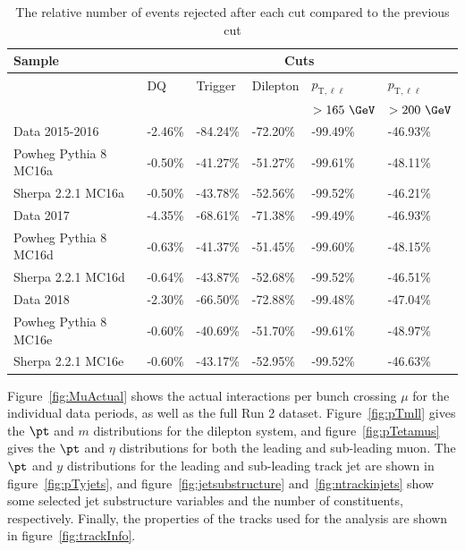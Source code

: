 \begin{table}[h!]
  \centering
  \begin{tabular}{l|l|l|l|l|l}
  \hline\hline
  \textbf{Sample} & \multicolumn{5}{c}{\textbf{Cuts}} \\ \hline
    & DQ & Trigger & Dilepton & $p_{\text{T},\ell\ell}$ & $p_{\text{T},\ell\ell}$ \\
    &  &  &  & $>165~\GeV$ & $>200~\GeV$ \\ \hline\hline
   Data 2015-2016 & -2.46\% & -84.24\% & -72.20\% & -99.49\% & -46.93\% \\ \hline
   Powheg Pythia 8 MC16a & -0.50\% & -41.27\% & -51.27\% & -99.61\% & -48.11\% \\ \hline
   Sherpa 2.2.1 MC16a & -0.50\% & -43.78\% & -52.56\% & -99.52\% & -46.21\% \\ \hline\hline
   Data 2017 & -4.35\% & -68.61\% & -71.38\% & -99.49\% & -46.93\% \\ \hline
   Powheg Pythia 8 MC16d & -0.63\% & -41.37\% & -51.45\% & -99.60\% & -48.15\% \\ \hline
   Sherpa 2.2.1 MC16d & -0.64\% & -43.87\% & -52.68\% & -99.52\% & -46.51\% \\ \hline\hline
   Data 2018 & -2.30\% & -66.50\% & -72.88\% & -99.48\% & -47.04\% \\ \hline
   Powheg Pythia 8 MC16e & -0.60\% & -40.69\% & -51.70\% & -99.61\% & -48.97\% \\ \hline
   Sherpa 2.2.1 MC16e & -0.60\% & -43.17\% & -52.95\% & -99.52\% & -46.63\% \\ \hline\hline
   \end{tabular}
   \caption{The relative number of events rejected after each cut compared to the previous cut}
   \label{tab:RelCF}
\end{table}

Figure~\ref{fig:MuActual} shows the actual interactions per bunch crossing $\mu$ for the individual data periods, as well as the full Run 2 dataset.
Figure~\ref{fig:pTmll} gives the $\pt$ and $m$ distributions for the dilepton system, and figure~\ref{fig:pTetamus} gives the $\pt$ and $\eta$ distributions for both the leading and sub-leading muon.
The $\pt$ and $y$ distributions for the leading and sub-leading track jet are shown in figure~\ref{fig:pTyjets}, and figure~\ref{fig:jetsubstructure} and~\ref{fig:ntrackinjets} show some
selected jet substructure variables and the number of constituents, respectively. Finally, the properties of the tracks used for the analysis are shown in figure~\ref{fig:trackInfo}.

